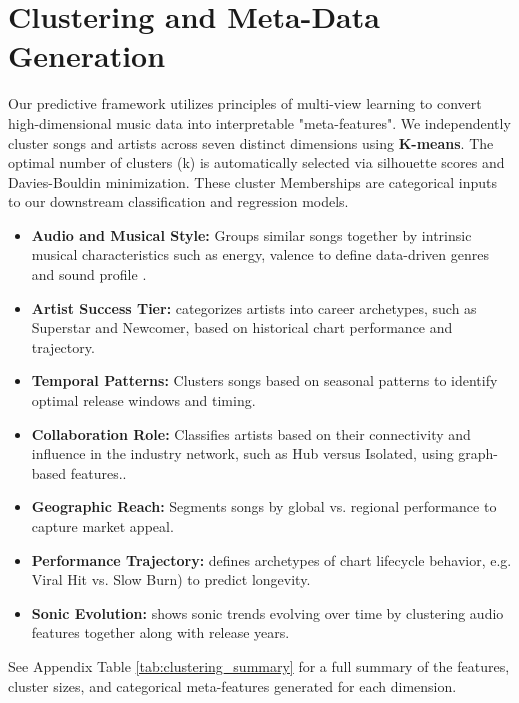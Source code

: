 \documentclass{article}
\begin{document}
\section{Clustering and Meta-Data Generation}
\vspace{-0.6em}
Our predictive framework utilizes principles of multi-view learning\cite{bickel2004multiview, xu2013survey} to convert high-dimensional music data into interpretable "meta-features". We independently cluster songs and artists across seven distinct dimensions using \textbf{K-means}\cite{kim2007music}. The optimal number of clusters (k) is automatically selected via silhouette scores and Davies-Bouldin minimization. These cluster Memberships are categorical inputs to our downstream classification and regression models.

\begin{itemize}[itemsep=0.5ex, topsep=0pt, parsep=0pt, partopsep=0pt, leftmargin=*]
    \item \textbf{Audio and Musical Style:}  Groups similar songs together by intrinsic musical characteristics such as energy, valence to define data-driven genres and sound profile \cite{lerch2022introduction}.
    \item \textbf{Artist Success Tier:} categorizes artists into career archetypes, such as Superstar and Newcomer, based on historical chart performance and trajectory.
    \item \textbf{Temporal Patterns:} Clusters songs based on seasonal patterns to identify optimal release windows and timing.
    \item \textbf{Collaboration Role:} Classifies artists based on their connectivity and influence in the industry network, such as Hub versus Isolated, using graph-based features.\cite{silva2019collaboration}.
    \item \textbf{Geographic Reach:} Segments songs by global vs. regional performance to capture market appeal.
    \item \textbf{Performance Trajectory:} defines archetypes of chart lifecycle behavior, e.g. Viral Hit vs. Slow Burn) to predict longevity.
    \item \textbf{Sonic Evolution:} shows sonic trends evolving over time by clustering audio features together along with release years.
\end{itemize}
See Appendix Table \ref{tab:clustering_summary} for a full summary of the features, cluster sizes, and categorical meta-features generated for each dimension.
\vspace{-0.6em}
\end{document}
